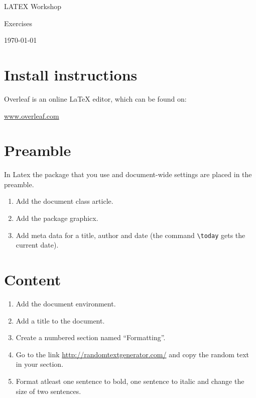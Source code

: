 \documentclass{article}
\begin{document}
\begin{center}
  {\Large LATEX Workshop\par}
  \vspace{0.5em}
  {\large Exercises\par}
  \vspace{1.5em}
  \today
\end{center}

\bigskip

\section*{Install instructions}
Overleaf is an online LaTeX editor, which can be found on:

\begin{center}
  \url{www.overleaf.com}
\end{center}

\section{Preamble}
In Latex the package that you use and document-wide settings are placed in the preamble.

\begin{enumerate}[label=\alph*)]
  \item Add the document class article.
  \item Add the package graphicx.
  \item Add meta data for a title, author and date (the command \verb|\today| gets the current date).
\end{enumerate}

\section{Content}
\begin{enumerate}[label=\alph*)]
  \item Add the document environment.
  \item Add a title to the document.
  \item Create a numbered section named ``Formatting''.
  \item Go to the link \url{http://randomtextgenerator.com/} and copy the random text in your section.
  \item Format atleast one sentence to bold, one sentence to italic and change the size of two sentences.
\end{enumerate}

\newpage
\end{document}
